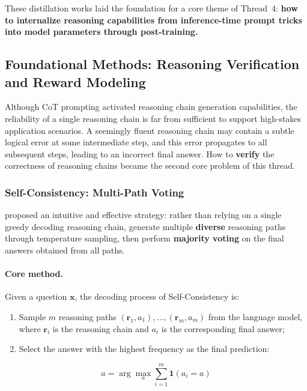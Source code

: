 \noindent
These distillation works laid the foundation for a core theme of Thread~4:
\textbf{how to internalize reasoning capabilities from inference-time prompt tricks into model parameters through post-training.}


\subsection{Foundational Methods: Reasoning Verification and Reward Modeling}
\label{sec:t4-foundation}

Although CoT prompting activated reasoning chain generation capabilities,
the reliability of a single reasoning chain is far from sufficient to support high-stakes application scenarios.
A seemingly fluent reasoning chain may contain a subtle logical error at some intermediate step,
and this error propagates to all subsequent steps, leading to an incorrect final answer.
How to \textbf{verify} the correctness of reasoning chains became the second core problem of this thread.

\subsubsection{Self-Consistency: Multi-Path Voting}
\label{sec:t4-self-consistency}

 proposed an intuitive and effective strategy:
rather than relying on a single greedy decoding reasoning chain,
generate multiple \textbf{diverse} reasoning paths through temperature sampling,
then perform \textbf{majority voting} on the final answers obtained from all paths.

\paragraph{Core method.}
Given a question $\mathbf{x}$, the decoding process of Self-Consistency is:
\begin{enumerate}[leftmargin=2em]
  \item Sample $m$ reasoning paths $(\mathbf{r}_1, a_1), \ldots, (\mathbf{r}_m, a_m)$ from the language model,
    where $\mathbf{r}_i$ is the reasoning chain and $a_i$ is the corresponding final answer;
  \item Select the answer with the highest frequency as the final prediction:
\end{enumerate}
\begin{equation}
\label{eq:self-consistency}
\hat{a} = \arg\max_{a} \sum_{i=1}^{m} \mathbf{1}(a_i = a)
\end{equation}

